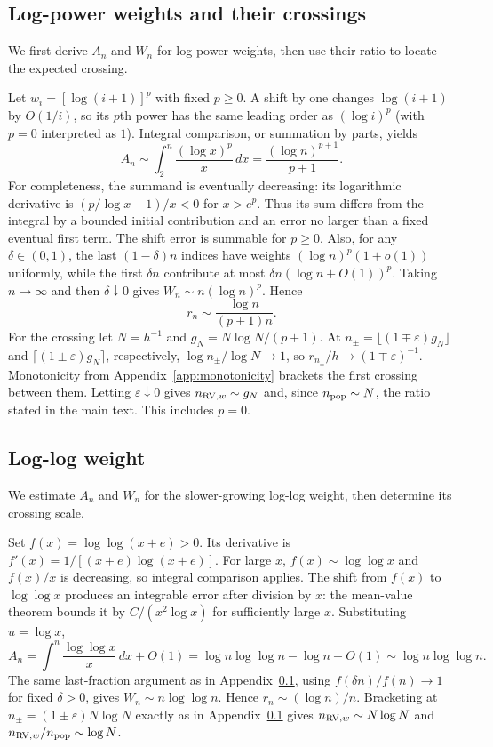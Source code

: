 \documentclass[11pt]{article}
\theoremstyle{definition}
\begin{document}
\subsection{Log-power weights and their crossings}\label{app:logpower}
We first derive $A_n$ and $W_n$ for log-power weights, then use their ratio to locate the expected crossing.

Let $w_i=[\log(i+1)]^p$ with fixed $p\ge0$. A shift by one changes $\log(i+1)$ by $O(1/i)$, so its $p$th power has the same leading order as $(\log i)^p$ (with $p=0$ interpreted as $1$). Integral comparison, or summation by parts, yields
\[
A_n\sim\int_2^n\frac{(\log x)^p}{x}\,dx
=\frac{(\log n)^{p+1}}{p+1}.
\]
For completeness, the summand is eventually decreasing: its logarithmic derivative is $(p/\log x-1)/x<0$ for $x>e^p$. Thus its sum differs from the integral by a bounded initial contribution and an error no larger than a fixed eventual first term. The shift error is summable for $p\ge0$. Also, for any $\delta\in(0,1)$, the last $(1-\delta)n$ indices have weights $(\log n)^p(1+o(1))$ uniformly, while the first $\delta n$ contribute at most $\delta n(\log n+O(1))^p$. Taking $n\to\infty$ and then $\delta\downarrow0$ gives $W_n\sim n(\log n)^p$. Hence
\[
r_n\sim\frac{\log n}{(p+1)n}.
\]
For the crossing let $N=h^{-1}$ and $g_N=N\log N/(p+1)$. At $n_\pm=\lfloor(1\mp\varepsilon)g_N\rfloor$ and $\lceil(1\pm\varepsilon)g_N\rceil$, respectively, $\log n_\pm/\log N\to1$, so $r_{n_\pm}/h\to(1\mp\varepsilon)^{-1}$. Monotonicity from Appendix~\ref{app:monotonicity} brackets the first crossing between them. Letting $\varepsilon\downarrow0$ gives $n_{{\rm RV},w}\sim g_N$ and, since $n_{\rm pop}\sim N$, the ratio stated in the main text. This includes $p=0$.

\subsection{Log-log weight}\label{app:loglog}
We estimate $A_n$ and $W_n$ for the slower-growing log-log weight, then determine its crossing scale.

Set $f(x)=\log\log(x+e)>0$. Its derivative is $f'(x)=1/[(x+e)\log(x+e)]$. For large $x$, $f(x)\sim\log\log x$ and $f(x)/x$ is decreasing, so integral comparison applies. The shift from $f(x)$ to $\log\log x$ produces an integrable error after division by $x$: the mean-value theorem bounds it by $C/(x^2\log x)$ for sufficiently large $x$. Substituting $u=\log x$,
\[
A_n=\int^n\frac{\log\log x}{x}\,dx+O(1)
=\log n\log\log n-\log n+O(1)
\sim\log n\log\log n.
\]
The same last-fraction argument as in Appendix~\ref{app:logpower}, using $f(\delta n)/f(n)\to1$ for fixed $\delta>0$, gives $W_n\sim n\log\log n$. Hence $r_n\sim(\log n)/n$. Bracketing at $n_\pm=(1\pm\varepsilon)N\log N$ exactly as in Appendix~\ref{app:logpower} gives $n_{{\rm RV},w}\sim N\log N$ and $n_{{\rm RV},w}/n_{\rm pop}\sim\log N$.
\end{document}
